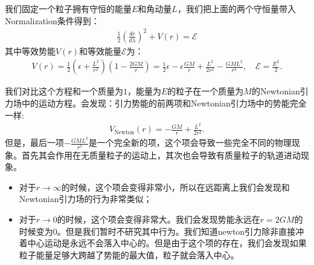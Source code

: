 \bigskip
{}

我们固定一个粒子拥有守恒的能量$ E $和角动量$ L $，我们把上面的两个守恒量带入Normalization条件得到：
\begin{align}\label{eq:radialeq}
  \frac{1}{2}\left(\frac{dr}{d\lambda}\right)^2+V(r)=\mathcal{E}
\end{align}
其中等效势能$ V(r) $和等效能量$ \mathcal{E} $为：
\begin{align}
  V(r)=\frac{1}{2}\left(\epsilon+\frac{L^2}{r^2}\right)\left(1-\frac{2GM}{r}\right)=\frac{1}{2}\epsilon-\epsilon\frac{GM}{r}+\frac{L^2}{2r^2}-\frac{GML^2}{r^3},
  \quad \mathcal{E}=\frac{E^2}{2}.
\end{align}

\bigskip
{}

我们对比这个方程和一个质量为$ 1 $，能量为$ E $的粒子在一个质量为$ M
$的Newtonian引力场中的运动方程。会发现：引力势能的前两项和Newtonian引力场中的势能完全一样:
\begin{align}
  V_{\text{Newton}}(r) = -\frac{GM}{r} + \frac{L^2}{2r^2}.
\end{align}
但是，最后一项$ -\frac{GML^2}{r^3}
$是一个完全新的项，这个项会导致一些完全不同的物理现象。首先其会作用在无质量粒子的运动上，其次也会导致有质量粒子的轨道进动现象。

\begin{itemize}
  \item 对于$ r \to \infty $的时候，这个项会变得非常小，所以在远距离上我们会发现和Newtonian引力场的行为非常类似；
  \item 对于$ r \to 0 $的时候，这个项会变得非常大。我们会发现势能永远在$ r = 2GM
    $的时候变为0。但是我们暂时不研究其中行为。我们知道newton引力除非直接冲着中心运动是永远不会落入中心的。但是由于这个项的存在，我们会发现如果粒子能量足够大跨越了势能的最大值，粒子就会落入中心。
\end{itemize}

\bigskip
{}

